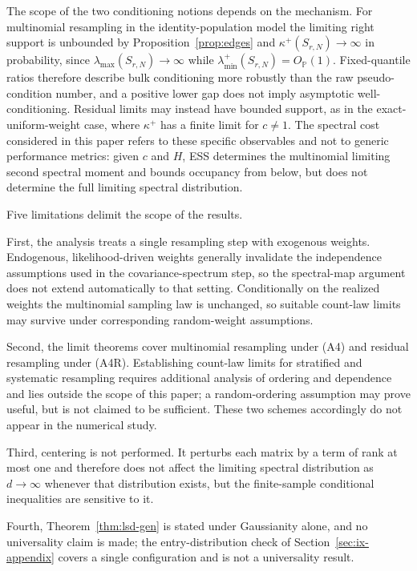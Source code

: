 \documentclass[lettersize,journal]{IEEEtran}
\theoremstyle{remark}
\begin{document}
The scope of the two conditioning notions depends on the mechanism. For
multinomial resampling in the identity-population model the limiting right
support is unbounded by Proposition~\ref{prop:edges} and
$\kappa^+(S_{r,N})\to\infty$ in probability, since
$\lambda_{\max}(S_{r,N})\to\infty$ while
$\lambda_{\min}^+(S_{r,N})=O_{\mathbb P}(1)$. Fixed-quantile ratios therefore
describe bulk conditioning more robustly than the raw pseudo-condition number,
and a positive lower gap does not imply asymptotic well-conditioning. Residual
limits may instead have bounded support, as in the exact-uniform-weight case,
where $\kappa^+$ has a finite limit for $c\neq1$. The spectral cost considered
in this paper refers to these specific observables and not to generic
performance metrics: given $c$ and $H$, ESS determines the multinomial
limiting second spectral moment and bounds occupancy from below, but does not
determine the full limiting spectral distribution.

Five limitations delimit the scope of the results.

First, the analysis treats a single resampling step with exogenous weights.
Endogenous, likelihood-driven weights generally invalidate the independence
assumptions used in the covariance-spectrum step, so the spectral-map argument
does not extend automatically to that setting. Conditionally on the realized
weights the multinomial sampling law is unchanged, so suitable count-law
limits may survive under corresponding random-weight assumptions.

Second, the limit theorems cover multinomial resampling under (A4) and
residual resampling under (A4R). Establishing count-law limits for stratified
and systematic resampling requires additional analysis of ordering and
dependence and lies outside the scope of this paper; a random-ordering
assumption may prove useful, but is not claimed to be sufficient. These two
schemes accordingly do not appear in the numerical study.

Third, centering is not performed. It perturbs each matrix by a term of rank
at most one and therefore does not affect the limiting spectral distribution
as $d\to\infty$ whenever that distribution exists, but the finite-sample
conditional inequalities are sensitive to it.

Fourth, Theorem~\ref{thm:lsd-gen} is stated under Gaussianity alone, and no
universality claim is made; the entry-distribution check of
Section~\ref{sec:ix-appendix} covers a single configuration and is not a
universality result.
\end{document}
